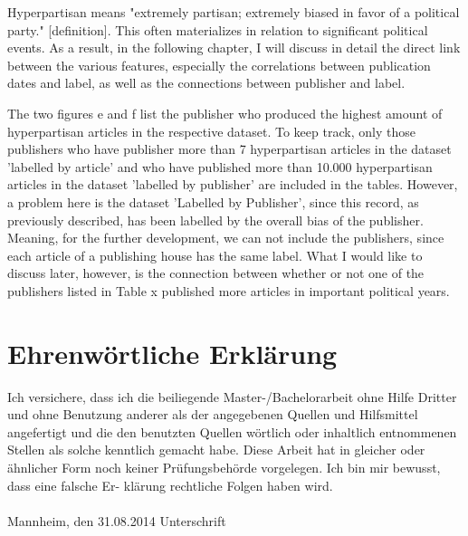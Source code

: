 \documentclass[11pt,titlepage,oneside,openany]{book}
\begin{document}
Hyperpartisan means "extremely partisan; extremely biased in favor of a political party." [definition]. This often materializes in relation to significant political events. As a result, in the following chapter, I will discuss in detail the direct link between the various features, especially the correlations between publication dates and label, as well as the connections between publisher and label.\\
\begin{figure}[h]
\end{figure}
\noindent The two figures e and f list the publisher who produced the highest amount of hyperpartisan articles in the respective dataset. To keep track, only those publishers who have publisher more than 7 hyperpartisan articles in the dataset 'labelled by article' and who have published more than 10.000 hyperpartisan articles in the dataset 'labelled by publisher' are included in the tables. However, a problem here is the dataset 'Labelled by Publisher', since this record, as previously described, has been labelled by the overall bias of the publisher. Meaning, for the further development, we can not include the publishers, since each article of a publishing house has the same label. What I would like to discuss later, however, is the connection between whether or not one of the publishers listed in Table x published more articles in important political years.

  





\newpage


\pagestyle{empty}


\section*{Ehrenw\"ortliche Erkl\"arung}
Ich versichere, dass ich die beiliegende Master-/Bachelorarbeit ohne Hilfe Dritter
und ohne Benutzung anderer als der angegebenen Quellen und Hilfsmittel
angefertigt und die den benutzten Quellen w\"ortlich oder inhaltlich
entnommenen Stellen als solche kenntlich gemacht habe. Diese Arbeit
hat in gleicher oder \"ahnlicher Form noch keiner Pr\"ufungsbeh\"orde
vorgelegen. Ich bin mir bewusst, dass eine falsche Er- kl\"arung rechtliche Folgen haben
wird.
\\
\\

\noindent
Mannheim, den 31.08.2014 \hspace{4cm} Unterschrift
\end{document}
